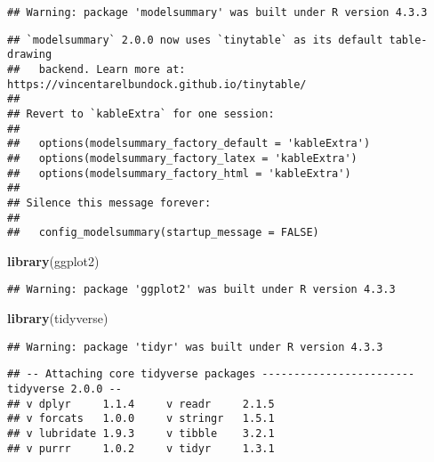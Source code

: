 \documentclass[
]{article}
\newenvironment{Shaded}{\begin{snugshade}}{\end{snugshade}}
\newcommand{\FunctionTok}[1]{\textcolor[rgb]{0.13,0.29,0.53}{\textbf{#1}}}
\newcommand{\NormalTok}[1]{#1}
\begin{document}
\begin{verbatim}
## Warning: package 'modelsummary' was built under R version 4.3.3
\end{verbatim}

\begin{verbatim}
## `modelsummary` 2.0.0 now uses `tinytable` as its default table-drawing
##   backend. Learn more at: https://vincentarelbundock.github.io/tinytable/
## 
## Revert to `kableExtra` for one session:
## 
##   options(modelsummary_factory_default = 'kableExtra')
##   options(modelsummary_factory_latex = 'kableExtra')
##   options(modelsummary_factory_html = 'kableExtra')
## 
## Silence this message forever:
## 
##   config_modelsummary(startup_message = FALSE)
\end{verbatim}

\begin{Shaded}
\begin{Highlighting}[]
\FunctionTok{library}\NormalTok{(ggplot2)}
\end{Highlighting}
\end{Shaded}

\begin{verbatim}
## Warning: package 'ggplot2' was built under R version 4.3.3
\end{verbatim}

\begin{Shaded}
\begin{Highlighting}[]
\FunctionTok{library}\NormalTok{(tidyverse)}
\end{Highlighting}
\end{Shaded}

\begin{verbatim}
## Warning: package 'tidyr' was built under R version 4.3.3
\end{verbatim}

\begin{verbatim}
## -- Attaching core tidyverse packages ------------------------ tidyverse 2.0.0 --
## v dplyr     1.1.4     v readr     2.1.5
## v forcats   1.0.0     v stringr   1.5.1
## v lubridate 1.9.3     v tibble    3.2.1
## v purrr     1.0.2     v tidyr     1.3.1
\end{verbatim}
\end{document}
